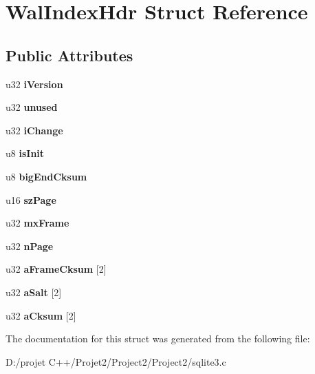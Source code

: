 \hypertarget{struct_wal_index_hdr}{}\section{Wal\+Index\+Hdr Struct Reference}
\label{struct_wal_index_hdr}
\subsection*{Public Attributes}
\begin{DoxyCompactItemize}
\item 
\mbox{\label{struct_wal_index_hdr_a49295f5eb9d6f37a1498cf1a66410b92}} 
u32 {\bfseries i\+Version}
\item 
\mbox{\label{struct_wal_index_hdr_aa00596b4ad38dce7f97261a49ce64d74}} 
u32 {\bfseries unused}
\item 
\mbox{\label{struct_wal_index_hdr_a9fafc4d4af9ab741b3b8733380a7927f}} 
u32 {\bfseries i\+Change}
\item 
\mbox{\label{struct_wal_index_hdr_a1cc0dc2be6cd108a7bcca260be3e4cb9}} 
u8 {\bfseries is\+Init}
\item 
\mbox{\label{struct_wal_index_hdr_aa6be53a6a60ea0b2a97a245b5ca68d61}} 
u8 {\bfseries big\+End\+Cksum}
\item 
\mbox{\label{struct_wal_index_hdr_a74e9182803402942cf6e45d8e23589c7}} 
u16 {\bfseries sz\+Page}
\item 
\mbox{\label{struct_wal_index_hdr_aa697dbe8134daf3d02dce07feb897f41}} 
u32 {\bfseries mx\+Frame}
\item 
\mbox{\label{struct_wal_index_hdr_ae4ca33947cd629feb9dce2b1f976c364}} 
u32 {\bfseries n\+Page}
\item 
\mbox{\label{struct_wal_index_hdr_a425dff294e0f0b30b6819c273404c721}} 
u32 {\bfseries a\+Frame\+Cksum} \mbox{[}2\mbox{]}
\item 
\mbox{\label{struct_wal_index_hdr_af99b92f673fd7ba1e4e4f9feb955453f}} 
u32 {\bfseries a\+Salt} \mbox{[}2\mbox{]}
\item 
\mbox{\label{struct_wal_index_hdr_aa202339b02766d088717bfce9e3a9c0e}} 
u32 {\bfseries a\+Cksum} \mbox{[}2\mbox{]}
\end{DoxyCompactItemize}


The documentation for this struct was generated from the following file\+:\begin{DoxyCompactItemize}
\item 
D\+:/projet C++/\+Projet2/\+Project2/\+Project2/sqlite3.\+c\end{DoxyCompactItemize}
